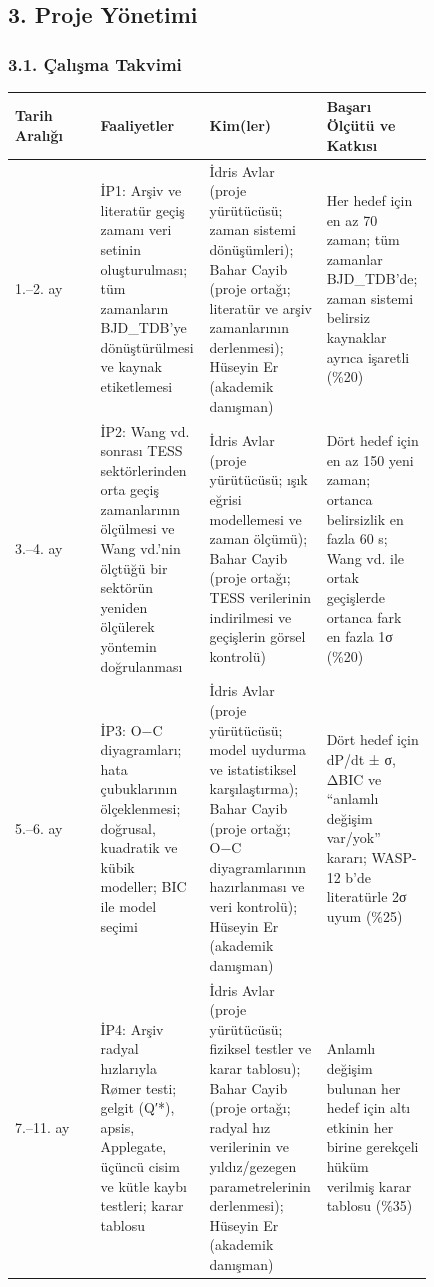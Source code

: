 \subsection*{3. Proje Yönetimi}
\subsubsection*{3.1. Çalışma Takvimi}
{\footnotesize\begin{longtable}{|p{0.207\linewidth}|p{0.207\linewidth}|p{0.207\linewidth}|p{0.207\linewidth}|}\hline
\textbf{Tarih Aralığı} & \textbf{Faaliyetler} & \textbf{Kim(ler)} & \textbf{Başarı Ölçütü ve Katkısı}\\\hline\endhead
1.–2. ay & İP1: Arşiv ve literatür geçiş zamanı veri setinin oluşturulması; tüm zamanların BJD\_TDB'ye dönüştürülmesi ve kaynak etiketlemesi & İdris Avlar (proje yürütücüsü; zaman sistemi dönüşümleri); Bahar Cayib (proje ortağı; literatür ve arşiv zamanlarının derlenmesi); Hüseyin Er (akademik danışman) & Her hedef için en az 70 zaman; tüm zamanlar BJD\_TDB'de; zaman sistemi belirsiz kaynaklar ayrıca işaretli (\%20)\\\hline
3.–4. ay & İP2: Wang vd. sonrası TESS sektörlerinden orta geçiş zamanlarının ölçülmesi ve Wang vd.'nin ölçtüğü bir sektörün yeniden ölçülerek yöntemin doğrulanması & İdris Avlar (proje yürütücüsü; ışık eğrisi modellemesi ve zaman ölçümü); Bahar Cayib (proje ortağı; TESS verilerinin indirilmesi ve geçişlerin görsel kontrolü) & Dört hedef için en az 150 yeni zaman; ortanca belirsizlik en fazla 60 s; Wang vd. ile ortak geçişlerde ortanca fark en fazla 1σ (\%20)\\\hline
5.–6. ay & İP3: O−C diyagramları; hata çubuklarının ölçeklenmesi; doğrusal, kuadratik ve kübik modeller; BIC ile model seçimi & İdris Avlar (proje yürütücüsü; model uydurma ve istatistiksel karşılaştırma); Bahar Cayib (proje ortağı; O−C diyagramlarının hazırlanması ve veri kontrolü); Hüseyin Er (akademik danışman) & Dört hedef için dP/dt ± σ, ΔBIC ve “anlamlı değişim var/yok” kararı; WASP-12 b'de literatürle 2σ uyum (\%25)\\\hline
7.–11. ay & İP4: Arşiv radyal hızlarıyla Rømer testi; gelgit (Q′*), apsis, Applegate, üçüncü cisim ve kütle kaybı testleri; karar tablosu & İdris Avlar (proje yürütücüsü; fiziksel testler ve karar tablosu); Bahar Cayib (proje ortağı; radyal hız verilerinin ve yıldız/gezegen parametrelerinin derlenmesi); Hüseyin Er (akademik danışman) & Anlamlı değişim bulunan her hedef için altı etkinin her birine gerekçeli hüküm verilmiş karar tablosu (\%35)\\\hline
\end{longtable}}
